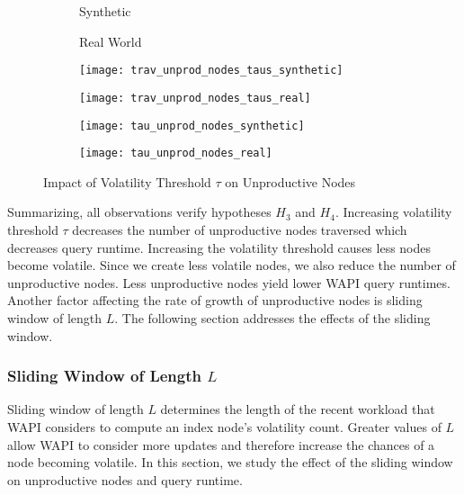 \documentclass[abstracton,12pt]{scrartcl}
\theoremstyle{definition}
\begin{document}
\begin{figure}
  \centering
  \begin{subfigure}{0.49\linewidth}
    \centering
    Synthetic
  \end{subfigure}
  \begin{subfigure}{0.49\linewidth}
    \centering
    Real World
  \end{subfigure}
  \begin{subfigure}{0.49\linewidth}
    \centering
    \texttt{[image: trav\_unprod\_nodes\_taus\_synthetic]}
    \caption{}
    \label{fig:trav_unprod_nodes_taus_synthetic}
  \end{subfigure}
  \begin{subfigure}{0.49\linewidth}
    \centering
    \texttt{[image: trav\_unprod\_nodes\_taus\_real]}
    \caption{}
    \label{fig:trav_unprod_nodes_taus_real}
  \end{subfigure}
  \begin{subfigure}{0.49\linewidth}
    \centering
    \texttt{[image: tau\_unprod\_nodes\_synthetic]}
    \caption{}
    \label{fig:tau_trav_unprod_nodes_synthetic}
  \end{subfigure}
  \begin{subfigure}{0.49\linewidth}
    \centering
    \texttt{[image: tau\_unprod\_nodes\_real]}
    \caption{}
    \label{fig:tau_trav_unprod_nodes_real}
  \end{subfigure}
  \caption{Impact of Volatility Threshold $\tau$ on Unproductive Nodes}
\end{figure}

Summarizing, all observations verify hypotheses $H_3$ and $H_4$.
Increasing volatility threshold $\tau$ decreases the number of unproductive
nodes traversed which decreases query runtime. Increasing the volatility
threshold causes less nodes become volatile. Since we create less volatile
nodes, we also reduce the number of unproductive nodes. Less unproductive
nodes yield lower WAPI query runtimes. Another factor affecting the rate of
growth of unproductive nodes is sliding window of length $L$. The following
section addresses the effects of the sliding window.

\subsubsection{Sliding Window of Length $L$}

Sliding window of length $L$ determines the length of the recent workload that WAPI
considers to compute an index node's volatility count. Greater values of $L$
allow WAPI to consider more updates and therefore increase the chances of a node
becoming volatile. In this section, we study
the effect of the sliding window on unproductive nodes and query runtime.
\end{document}

